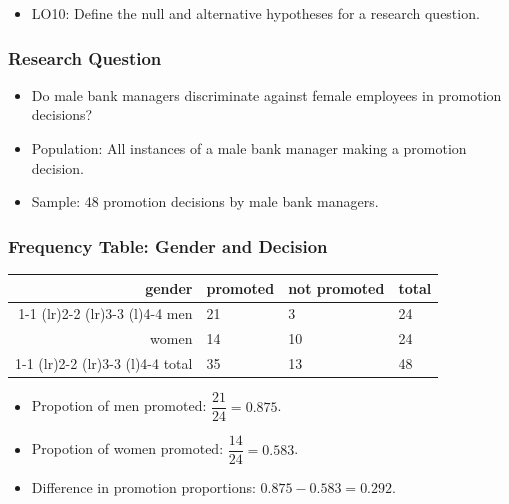 \documentclass{beamer}
\begin{document}
\begin{frame}
  \begin{itemize}
    \item[] 
      LO10: Define the null and alternative hypotheses for a research
      question. 
  \end{itemize}
\end{frame}

\begin{frame}
  \frametitle{Research Question}
  \begin{itemize}
    \item[] 
      Do male bank managers discriminate against female employees in
      promotion decisions? 
      \vspace{0.5cm}
    \item[] 
      Population: All instances of a male bank manager making a
      promotion decision.
      \vspace{0.5cm}
    \item[] 
      Sample: 48 promotion decisions by male bank managers.
  \end{itemize}
\end{frame}

\begin{frame}
  \frametitle{Frequency Table: Gender and Decision}
  \begin{table}
    \begin{tabular}{@{}rlll@{}}
      \toprule
      gender & promoted & not promoted & total \\ 
      \cmidrule(r){1-1} \cmidrule(lr){2-2} \cmidrule(lr){3-3}
      \cmidrule(l){4-4}
      men & 21 & 3 & 24 \\[0.3em]
      women & 14 & 10 & 24 \\[0.3em]
      \cmidrule(r){1-1} \cmidrule(lr){2-2} \cmidrule(lr){3-3}
      \cmidrule(l){4-4}
      total & 35 & 13 & 48 \\[0.3em]
      \bottomrule
    \end{tabular}
  \end{table}
  \begin{itemize}
    \item[] Propotion of men promoted: $\dfrac{21}{24} = 0.875$. 
      \vspace{0.5cm}
    \item[] Propotion of women promoted: $\dfrac{14}{24} = 0.583$. 
      \vspace{0.5cm}
    \item[] Difference in promotion proportions: $0.875 - 0.583 = 0.292$.
  \end{itemize}
\end{frame}
\end{document}
